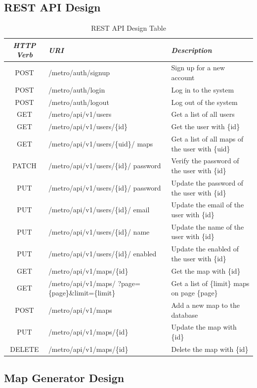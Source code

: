 \subsection{REST API Design}
\begin{table}[ht]
  \centering
  \begin{tabularx}{\textwidth}{>{\raggedright}cXX} %
    \toprule[1.5pt]
    \textit{HTTP Verb} & \textit{URI} & \textit{Description} \\
    \midrule[1.5pt]
    POST & /metro/auth/signup & Sign up for a new account \\
    \midrule
    POST & /metro/auth/login & Log in to the system \\
    \midrule
    POST & /metro/auth/logout & Log out of the system \\
    \midrule
    GET & /metro/api/v1/users & Get a list of all users \\
    \midrule
    GET & /metro/api/v1/users/\{id\} & Get the user with \{id\} \\
    \midrule
    GET & /metro/api/v1/users/\{uid\}/ maps & Get a list of all maps of the user with \{uid\} \\
    \midrule
    PATCH & /metro/api/v1/users/\{id\}/ password & Verify the password of the user with \{id\} \\
    \midrule
    PUT & /metro/api/v1/users/\{id\}/ password & Update the password of the user with \{id\} \\
    \midrule
    PUT & /metro/api/v1/users/\{id\}/ email & Update the email of the user with \{id\} \\
    \midrule
    PUT & /metro/api/v1/users/\{id\}/ name & Update the name of the user with \{id\} \\
    \midrule
    PUT & /metro/api/v1/users/\{id\}/ enabled & Update the enabled of the user with \{id\} \\
    \midrule
    GET & /metro/api/v1/maps/\{id\} & Get the map with \{id\} \\
    \midrule
    GET & /metro/api/v1/maps/ ?page=\{page\}\&limit=\{limit\} & Get a list of \{limit\} maps on page \{page\} \\
    \midrule
    POST & /metro/api/v1/maps & Add a new map to the database \\
    \midrule
    PUT & /metro/api/v1/maps/\{id\} & Update the map with \{id\} \\
    \midrule
    DELETE & /metro/api/v1/maps/\{id\} & Delete the map with \{id\} \\
    \bottomrule[1.5pt]
  \end{tabularx}
  \caption[REST API Design Table]{REST API Design Table}
  \label{REST API Design Table}
\end{table}

\subsection{Map Generator Design}
